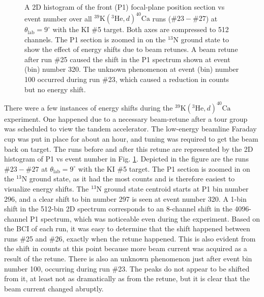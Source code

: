 \begin{figure}[t]
\begin{tikzpicture}[scale=1.12, every node/.style={transform shape}]
\end{tikzpicture}
\caption{\label{fig:9deg_P1vsEvt}A 2D histogram of the front (P1) focal-plane position section vs event number over all $^{39}\mathrm{K}(^{3}\mathrm{He},d)^{40}\mathrm{Ca}$ runs ($\#23-\#27$) at $\theta_{\mathrm{lab}} = 9^{\circ}$ with the KI $\#$5 target. Both axes are compressed to 512 channels. The P1 section is zoomed in on the $^{13}$N ground state to show the effect of energy shifts due to beam retunes. A beam retune after run $\#$25 caused the shift in the P1 spectrum shown at event (bin) number 320. The unknown phenomenon at event (bin) number 100 occurred during run $\#$23, which caused a reduction in counts but no energy shift.}
\end{figure}

There were a few instances of energy shifts during the $^{39}\mathrm{K}(^{3}\mathrm{He},d)^{40}\mathrm{Ca}$ experiment. One happened due to a necessary beam-retune after a tour group was scheduled to view the tandem accelerator. The low-energy beamline Faraday cup was put in place for about an hour, and tuning was required to get the beam back on target. The runs before and after this retune are represented by the 2D histogram of P1 vs event number in Fig. \ref{fig:9deg_P1vsEvt}. Depicted in the figure are the runs $\#23-\#27$ at $\theta_{\mathrm{lab}} = 9^{\circ}$ with the KI $\#$5 target. The P1 section is zoomed in on the $^{13}$N ground state, as it had the most counts and is therefore easiest to visualize energy shifts. The $^{13}$N ground state centroid starts at P1 bin number 296, and a clear shift to bin number 297 is seen at event number 320. A 1-bin shift in the 512-bin 2D spectrum corresponds to an 8-channel shift in the 4096-channel P1 spectrum, which was noticeable even during the experiment. Based on the BCI of each run, it was easy to determine that the shift happened between runs $\#$25 and $\#$26, exactly when the retune happened. This is also evident from the shift in counts at this point because more beam current was acquired as a result of the retune. There is also an unknown phenomenon just after event bin number 100, occurring during run $\#$23. The peaks do not appear to be shifted from it, at least not as dramatically as from the retune, but it is clear that the beam current changed abruptly.

